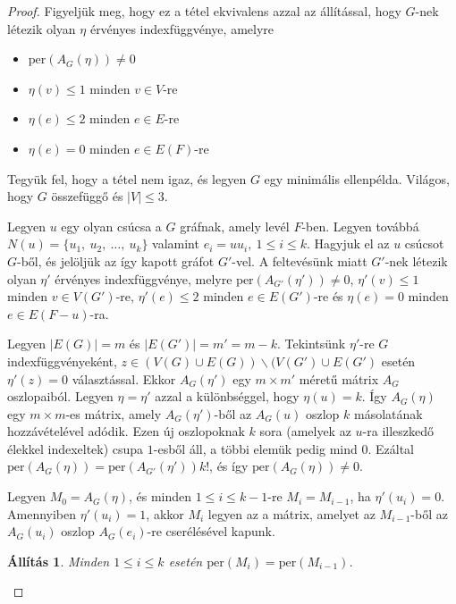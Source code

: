 \documentclass[12pt, a4paper]{report}
\newtheorem{áll}[tét]{Állítás}
\theoremstyle{remark}
\theoremstyle{definition}
\begin{document}
\begin{proof}
Figyeljük meg, hogy ez a tétel ekvivalens azzal az állítással, hogy $G$-nek létezik olyan $\eta$ érvényes indexfüggvénye, amelyre
\begin{itemize}
\item $\mathrm{per}(A_G(\eta)) \neq 0$
\item $\eta(v) \leq 1$ minden $v \in V$-re
\item $\eta(e) \leq 2$ minden $e \in E$-re
\item $\eta(e) = 0$ minden $e \in E(F)$-re
\end{itemize}

Tegyük fel, hogy a tétel nem igaz, és legyen $G$ egy minimális ellenpélda. Világos, hogy $G$ összefüggő és $|V| \leq 3$.

Legyen $u$ egy olyan csúcsa a $G$ gráfnak, amely levél $F$-ben. Legyen továbbá $N(u) = \lbrace u_1,\ u_2,\ \ldots,\ u_k \rbrace$ valamint $e_i = uu_i,\ 1 \leq i \leq k$. Hagyjuk el az $u$ csúcsot $G$-ből, és jelöljük az így kapott gráfot $G'$-vel. A feltevésünk miatt $G'$-nek létezik olyan $\eta'$ érvényes indexfüggvénye, melyre $\mathrm{per}(A_{G'}(\eta')) \neq 0$, $\eta'(v) \leq 1$ minden $v \in V(G')$-re, $\eta'(e) \leq 2$ minden $e \in E(G')$-re és $\eta(e) = 0$ minden $e \in E(F - u)$-ra.

Legyen $|E(G)| = m$ és $|E(G')| = m' = m - k$. Tekintsünk $\eta'$-re $G$ indexfüggvényeként, $z \in (V(G) \cup E(G)) \smallsetminus (V(G') \cup E(G')$ esetén $\eta'(z) = 0$ választással. Ekkor $A_G(\eta')$ egy $m \times m'$ méretű mátrix $A_G$ oszlopaiból. Legyen $\eta = \eta'$ azzal a különbséggel, hogy $\eta(u) = k$. Így $A_G(\eta)$ egy $m \times m$-es mátrix, amely $A_G(\eta')$-ből az $A_G(u)$ oszlop $k$ másolatának hozzávételével adódik. Ezen új oszlopoknak $k$ sora (amelyek az $u$-ra illeszkedő élekkel indexeltek) csupa $1$-esből áll, a többi elemük pedig mind $0$. Ezáltal $\mathrm{per}(A_G(\eta)) = \mathrm{per}(A_{G'}(\eta')) k!$, és így $\mathrm{per}(A_G(\eta)) \neq 0$.

Legyen $M_0 = A_G(\eta)$, és minden $1 \leq i \leq k - 1$-re $M_i = M_{i - 1}$, ha $\eta'(u_i) = 0$. Amennyiben $\eta'(u_i) = 1$, akkor $M_i$ legyen az a mátrix, amelyet az $M_{i - 1}$-ből az $A_G(u_i)$ oszlop $A_G(e_i)$-re cserélésével kapunk.

\begin{áll}
Minden $1 \leq i \leq k$ esetén $\mathrm{per}(M_i) = \mathrm{per}(M_{i - 1})$.
\end{áll}


\end{proof}
\end{document}
